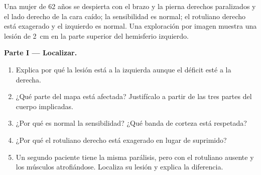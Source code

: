 \begin{problem}
\label{pb:g12:brain-and-movement:1}
Una mujer de 62 años se despierta con el brazo y la pierna derechos
paralizados y el lado derecho de la cara caído; la sensibilidad es
normal; el  rotuliano derecho está exagerado y el izquierdo es
normal. Una exploración por imagen muestra una lesión de \qty{2}{cm} en
la parte superior del hemisferio izquierdo.

\medskip
\noindent\textbf{Parte I --- Localizar.}
\begin{enumerate}
  \item Explica por qué la lesión está a la izquierda aunque el déficit
        esté a la derecha.
  \item ¿Qué parte del mapa está afectada? Justifícalo a partir de las
        tres partes del cuerpo implicadas.
  \item ¿Por qué es normal la sensibilidad? ¿Qué banda de corteza está
        respetada?
  \item ¿Por qué el  rotuliano derecho está exagerado en lugar
        de suprimido?
  \item Un segundo paciente tiene la misma parálisis, pero con el
         rotuliano ausente y los músculos atrofiándose. Localiza
        su lesión y explica la diferencia.
\end{enumerate}


\end{problem}

